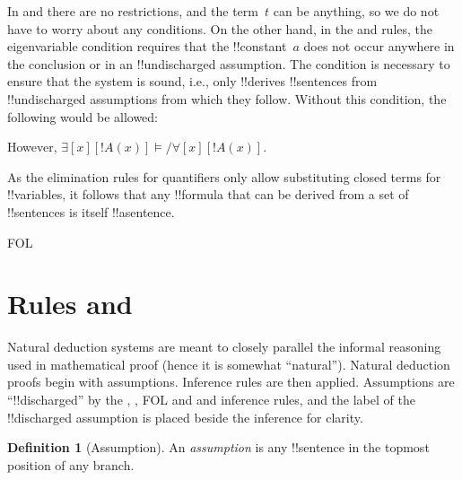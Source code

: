 \documentclass[10pt,a4paper]{article}
\theoremstyle{plain}
\theoremstyle{definition}
\newtheorem{defn}[thm]{Definition}
\theoremstyle{remark}
\newenvironment{explain}{}{}
\newcommand*{\olfileid}[3]{}
\newcommand*{\olsection}[1]{\section*{#1}}
\providecommand{\AxiomC}[1]{}
\providecommand{\UnaryInfC}[1]{}
\providecommand{\BinaryInfC}[1]{}
\providecommand{\RightLabel}[1]{}
\newenvironment{prooftree}{}{}
\providecommand{\lif}{\mathbin{\rightarrow}}
\providecommand{\lforall}{\mathord{\forall}}
\providecommand{\lexists}{\mathord{\exists}}
\providecommand{\Entails}{\mathrel{\models}}
\providecommand{\iftag}[1]{#1}
\providecommand{\Elim}[1]{}
\providecommand{\Intro}[1]{}
\providecommand{\Discharge}{\mathrm{Dis}}
\providecommand{\Intro}{\mathrm{I}}
\begin{document}
\begin{explain}
In \Intro{\lexists} and \Elim{\lforall} there are no restrictions, and
the term~$t$ can be anything, so we do not have to worry about any
conditions. On the other hand, in the \Elim{\lexists} and
\Intro{\lforall} rules, the eigenvariable condition requires that the
!!{constant}~$a$ does not occur anywhere in the conclusion or in an
!!{undischarged} assumption. The condition is necessary to ensure that
the system is sound, i.e., only !!{derive}s !!{sentence}s from
!!{undischarged} assumptions from which they follow. Without this
condition, the following would be allowed:
\begin{prooftree}
  \AxiomC{$\lexists[x][!A(x)]$}
  \AxiomC{$\Discharge{!A(a)}{1}$}
  \RightLabel{*\Intro{\lforall}}
  \UnaryInfC{$\lforall[x][!A(x)]$}
  \RightLabel{\Elim{\lexists}}
  \BinaryInfC{$\lforall[x][!A(x)]$}
\end{prooftree}
However, $\lexists[x][!A(x)] \Entails/ \lforall[x][!A(x)]$.

As the elimination rules for quantifiers only allow substituting
closed terms for !!{variable}s, it follows that any !!{formula} that
can be derived from a set of !!{sentence}s is itself !!a{sentence}.
\end{explain}






\iftag{FOL}
      {\olfileid{fol}{ntd}{rul}}
      {\olfileid{pl}{ntd}{rul}}

\olsection{Rules and }

\begin{explain}
Natural deduction systems are meant to closely parallel the informal
reasoning used in mathematical proof (hence it is somewhat
``natural''). Natural deduction proofs begin with assumptions.
Inference rules are then applied. Assumptions are ``!!{discharged}''
by the \Intro{\lnot}, \Intro{\lif}, \iftag{FOL}{\Elim{\lor} and
  \Elim{\lexists}}{ and \Elim{\lor}} inference rules, and the label of
the !!{discharged} assumption is placed beside the inference for
clarity.
\end{explain}

\begin{defn}[Assumption]
An \emph{assumption} is any !!{sentence}
in the topmost position of any branch.
\end{defn}
\end{document}
